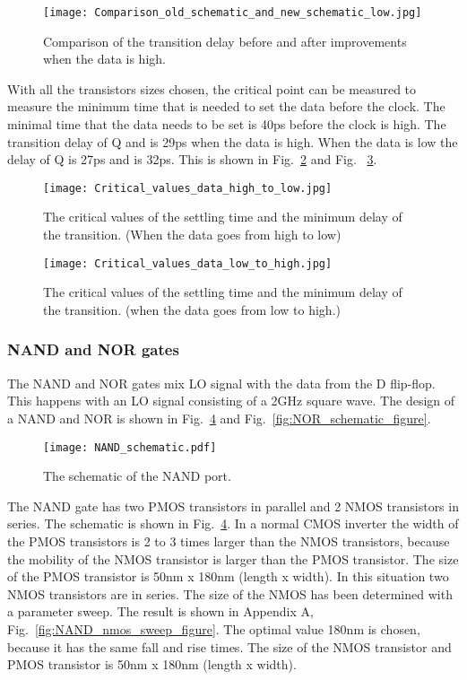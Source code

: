 \begin{figure}[h]
\texttt{[image: Comparison\_old\_schematic\_and\_new\_schematic\_low.jpg]}
\caption{ Comparison of the transition delay before and after improvements when the data is high.}
\label{fig:Comparison_old_schematic_and_new_schematic_low_figure}
\end{figure}

With all the transistors sizes chosen, the critical point can be measured to measure the minimum time that is needed to set the data before the clock. The minimal time that the data needs to be set is 40ps before the clock is high. The transition delay of Q and  is 29ps when the data is high. When the data is low the delay of Q is 27ps and  is 32ps. This is shown in Fig.~\ref{fig:Critical_values_data_high_to_low_figure} and Fig. ~\ref{fig:Critical_values_data_low_to_high_figure}.


\begin{figure}[h]
\texttt{[image: Critical\_values\_data\_high\_to\_low.jpg]}
\caption{The critical values of the settling time and the minimum delay of the transition. (When the data goes from high to low)}
\label{fig:Critical_values_data_high_to_low_figure}
\end{figure}

\begin{figure}[h]
\texttt{[image: Critical\_values\_data\_low\_to\_high.jpg]}
\caption{ The critical values of the settling time and the minimum delay of the transition. (when the data goes from low to high.)}
\label{fig:Critical_values_data_low_to_high_figure}
\end{figure}

\subsubsection{NAND and NOR gates}\label{sec:frontend}
The NAND and NOR gates mix LO signal with the data from the D flip-flop. This happens with an LO signal consisting of a 2GHz square wave.
The design of a NAND and NOR is shown in Fig.~\ref{fig:NAND_schematic_figure} and Fig.~\ref{fig:NOR_schematic_figure}.

\begin{figure}[htp]
\texttt{[image: NAND\_schematic.pdf]}
\caption{The schematic of the NAND port.}
\label{fig:NAND_schematic_figure}
\end{figure}

The NAND gate has two PMOS transistors in parallel and 2 NMOS transistors in series. The schematic is shown in Fig.~\ref{fig:NAND_schematic_figure}. In a normal CMOS inverter the width of the PMOS transistors is 2 to 3 times larger than the NMOS transistors, because the mobility of the NMOS transistor is larger than the PMOS transistor. The size of the PMOS transistor is 50nm x 180nm (length x width). In this situation two NMOS transistors are in series. The size of the NMOS has been determined with a parameter sweep. The result is shown in Appendix A, Fig.~\ref{fig:NAND_nmos_sweep_figure}. The optimal value 180nm is chosen, because it has the same fall and rise times. The size of the NMOS transistor and PMOS transistor is 50nm x 180nm (length x width).

